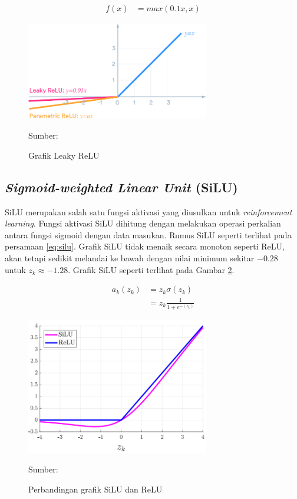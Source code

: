     \begin{align}
        \label{eq:l-relu}
        f(x) &= max(0.1x, x)
    \end{align}

    \begin{figure}[H]
        \begin{center}
            \includegraphics[width=8cm]{../img/Leaky ReLU - Latex.png}
            \caption{Grafik Leaky ReLU}
            \label{fig:l-relu}
            Sumber: \citep{Xu2015}
        \end{center}
    \end{figure}

    \subsection{\textit{Sigmoid-weighted Linear Unit} (SiLU)}
    SiLU merupakan salah satu fungsi aktivasi yang diusulkan untuk \textit{reinforcement learning}. Fungsi aktivasi SiLU dihitung dengan melakukan operasi perkalian antara fungsi sigmoid dengan data masukan. Rumus SiLU seperti terlihat pada persamaan \ref{eq:silu}. Grafik SiLU tidak menaik secara monoton seperti ReLU, akan tetapi sedikit melandai ke bawah dengan nilai minimum sekitar $-0.28$ untuk $z_k \approx -1.28$. Grafik SiLU seperti terlihat pada Gambar \ref{fig:silu}.

    \begin{align}
        \label{eq:silu}
        a_k(z_k) &= z_k\sigma (z_k)\nonumber\\
        &= z_k\frac{1}{1+e^{-(z_k)}}
    \end{align}

    \begin{figure}[H]
        \begin{center}
            \includegraphics[width=8cm]{../img/SiLU - Latex.PNG}
            \caption{Perbandingan grafik SiLU dan ReLU}
            \label{fig:silu}
            Sumber: \citep{Elfwing2018}
        \end{center}
    \end{figure}

